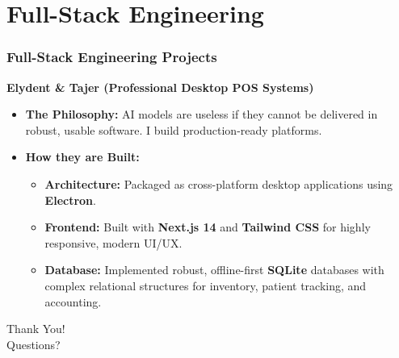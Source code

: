 \documentclass[aspectratio=169]{beamer}
\begin{document}
\section{Full-Stack Engineering}
\begin{frame}
\frametitle{Full-Stack Engineering Projects}
\textbf{Elydent \& Tajer (Professional Desktop POS Systems)}
\vspace{0.3cm}
\begin{itemize}
    \item \textbf{The Philosophy:} AI models are useless if they cannot be delivered in robust, usable software. I build production-ready platforms.
    \item \textbf{How they are Built:}
    \begin{itemize}
        \item \textbf{Architecture:} Packaged as cross-platform desktop applications using \textbf{Electron}.
        \item \textbf{Frontend:} Built with \textbf{Next.js 14} and \textbf{Tailwind CSS} for highly responsive, modern UI/UX.
        \item \textbf{Database:} Implemented robust, offline-first \textbf{SQLite} databases with complex relational structures for inventory, patient tracking, and accounting.
    \end{itemize}
\end{itemize}
\end{frame}

\begin{frame}
\begin{center}
    \Huge Thank You! \\
    \vspace{0.5cm}
    \large Questions?
\end{center}
\end{frame}
\end{document}
